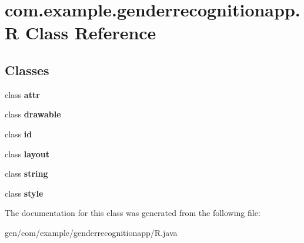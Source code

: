 \hypertarget{classcom_1_1example_1_1genderrecognitionapp_1_1_r}{}\section{com.\+example.\+genderrecognitionapp.\+R Class Reference}
\label{classcom_1_1example_1_1genderrecognitionapp_1_1_r}
\subsection*{Classes}
\begin{DoxyCompactItemize}
\item 
class {\bfseries attr}
\item 
class {\bfseries drawable}
\item 
class {\bfseries id}
\item 
class {\bfseries layout}
\item 
class {\bfseries string}
\item 
class {\bfseries style}
\end{DoxyCompactItemize}


The documentation for this class was generated from the following file\+:\begin{DoxyCompactItemize}
\item 
gen/com/example/genderrecognitionapp/R.\+java\end{DoxyCompactItemize}
